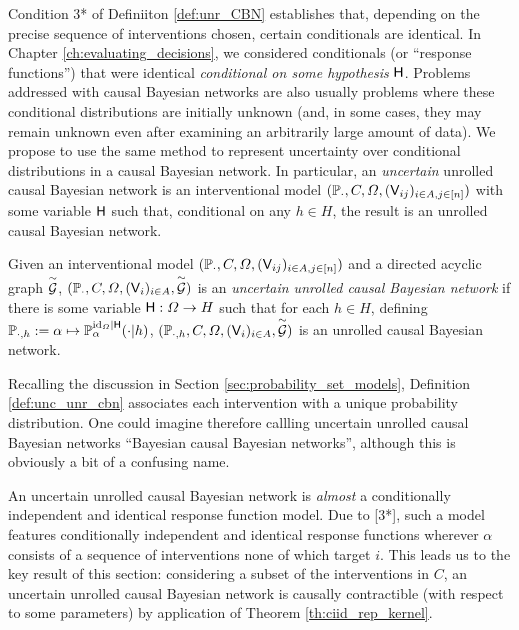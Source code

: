 Condition 3* of Definiiton \ref{def:unr_CBN} establishes that, depending on the precise sequence of interventions chosen, certain conditionals are identical. In Chapter \ref{ch:evaluating_decisions}, we considered conditionals (or ``response functions'') that were identical \emph{conditional on some hypothesis} $\mathsf{H}$. Problems addressed with causal Bayesian networks are also usually problems where these conditional distributions are initially unknown (and, in some cases, they may remain unknown even after examining an arbitrarily large amount of data). We propose to use the same method to represent uncertainty over conditional distributions in a causal Bayesian network. In particular, an \emph{uncertain} unrolled causal Bayesian network is an interventional model $(\mathbb{P}_\cdot,C,\Omega,(\mathsf{V}_{ij})_{i\in A,j\in [n]})$ with some variable $\mathsf{H}$ such that, conditional on any $h\in H$, the result is an unrolled causal Bayesian network.

\begin{definition}\label{def:unc_unr_cbn}
Given an interventional model $(\mathbb{P}_\cdot,C,\Omega,(\mathsf{V}_{ij})_{i\in A,j\in [n]})$ and a directed acyclic graph $\overset{\sim}{\mathcal{G}}$, $(\mathbb{P}_\cdot,C,\Omega,(\mathsf{V}_i)_{i\in A},\overset{\sim}{\mathcal{G}})$ is an \emph{uncertain unrolled causal Bayesian network} if there is some variable $\mathsf{H}:\Omega\to H$ such that for each $h\in H$, defining $\mathbb{P}_{\cdot,h}:= \alpha\mapsto \mathbb{P}_\alpha^{\mathrm{id}_{\Omega}|\mathsf{H}}(\cdot|h)$, $(\mathbb{P}_{\cdot,h},C,\Omega,(\mathsf{V}_i)_{i\in A},\overset{\sim}{\mathcal{G}})$ is an unrolled causal Bayesian network.
\end{definition}

Recalling the discussion in Section \ref{sec:probability_set_models}, Definition \ref{def:unc_unr_cbn} associates each intervention with a unique probability distribution. One could imagine therefore callling uncertain unrolled causal Bayesian networks ``Bayesian causal Bayesian networks'', although this is obviously a bit of a confusing name.

An uncertain unrolled causal Bayesian network is \emph{almost} a conditionally independent and identical response function model. Due to [3*], such a model features conditionally independent and identical response functions wherever $\alpha$ consists of a sequence of interventions none of which target $i$. This leads us to the key result of this section: considering a subset of the interventions in $C$, an uncertain unrolled causal Bayesian network is causally contractible (with respect to some parameters) by application of Theorem \ref{th:ciid_rep_kernel}.

